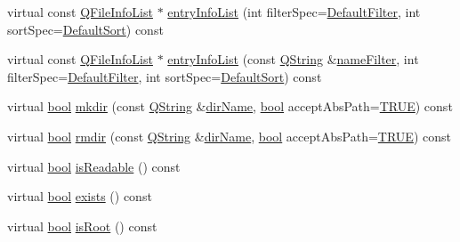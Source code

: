 \begin{DoxyCompactItemize}
\item 
virtual const \hyperlink{qdir_8h_a2bab9b680b49f76a34224e15eb238642}{Q\+File\+Info\+List} $\ast$ \hyperlink{class_q_dir_aa67974b4e5452af01677d2d57991f36a}{entry\+Info\+List} (int filter\+Spec=\hyperlink{class_q_dir_a8b8c5b4f0028081f094c85129b8cc8b1a592073bc83aaadb4120fb7a9fdf1016c}{Default\+Filter}, int sort\+Spec=\hyperlink{class_q_dir_a428a858abe9593efc498b6641b41994ca34834a05408264ddaae5f0259fb79038}{Default\+Sort}) const 
\item 
virtual const \hyperlink{qdir_8h_a2bab9b680b49f76a34224e15eb238642}{Q\+File\+Info\+List} $\ast$ \hyperlink{class_q_dir_a9439ea6b331957f38dbad981c4d050ef}{entry\+Info\+List} (const \hyperlink{class_q_string}{Q\+String} \&\hyperlink{class_q_dir_a8d501954ccb9e48d8e675c85c60ec57a}{name\+Filter}, int filter\+Spec=\hyperlink{class_q_dir_a8b8c5b4f0028081f094c85129b8cc8b1a592073bc83aaadb4120fb7a9fdf1016c}{Default\+Filter}, int sort\+Spec=\hyperlink{class_q_dir_a428a858abe9593efc498b6641b41994ca34834a05408264ddaae5f0259fb79038}{Default\+Sort}) const 
\item 
virtual \hyperlink{qglobal_8h_a1062901a7428fdd9c7f180f5e01ea056}{bool} \hyperlink{class_q_dir_ab85d98ede6a4f9cfefd18c5472530548}{mkdir} (const \hyperlink{class_q_string}{Q\+String} \&\hyperlink{class_q_dir_a12b679447f94f6eb194ec9bfb2a6d8a4}{dir\+Name}, \hyperlink{qglobal_8h_a1062901a7428fdd9c7f180f5e01ea056}{bool} accept\+Abs\+Path=\hyperlink{qglobal_8h_a04a6422a52070f0dc478693da640242b}{T\+R\+U\+E}) const 
\item 
virtual \hyperlink{qglobal_8h_a1062901a7428fdd9c7f180f5e01ea056}{bool} \hyperlink{class_q_dir_a1c2f73242e6c485b9e4b697560c846da}{rmdir} (const \hyperlink{class_q_string}{Q\+String} \&\hyperlink{class_q_dir_a12b679447f94f6eb194ec9bfb2a6d8a4}{dir\+Name}, \hyperlink{qglobal_8h_a1062901a7428fdd9c7f180f5e01ea056}{bool} accept\+Abs\+Path=\hyperlink{qglobal_8h_a04a6422a52070f0dc478693da640242b}{T\+R\+U\+E}) const 
\item 
virtual \hyperlink{qglobal_8h_a1062901a7428fdd9c7f180f5e01ea056}{bool} \hyperlink{class_q_dir_ad973387ed744650508d00b3da579efcf}{is\+Readable} () const 
\item 
virtual \hyperlink{qglobal_8h_a1062901a7428fdd9c7f180f5e01ea056}{bool} \hyperlink{class_q_dir_a1294085ddb97ecd3643b700feb3fabea}{exists} () const 
\item 
virtual \hyperlink{qglobal_8h_a1062901a7428fdd9c7f180f5e01ea056}{bool} \hyperlink{class_q_dir_a44c8042bcce4b07fffc0c907b9842604}{is\+Root} () const 
\item 

\end{DoxyCompactItemize}
